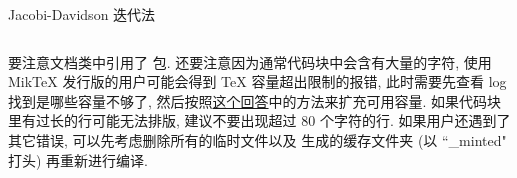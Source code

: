 \begin{listing}
  \caption{Jacobi-Davidson 迭代法}\label{code:JD-iter}
  \inputminted{matlab}{codes/jacobi_davidson.m}
\end{listing}

要注意文档类中引用了  包. 还要注意因为通常代码块中会含有大量的字符, 使用 MikTeX 发行版的用户可能会得到 TeX 容量超出限制的报错, 此时需要先查看 log 找到是哪些容量不够了, 然后按照\href{https://tex.stackexchange.com/a/548335/}{这个回答}中的方法来扩充可用容量. 如果代码块里有过长的行可能无法排版, 建议不要出现超过 80 个字符的行. 如果用户还遇到了其它错误, 可以先考虑删除所有的临时文件以及  生成的缓存文件夹 (以 ``\_minted" 打头) 再重新进行编译.

